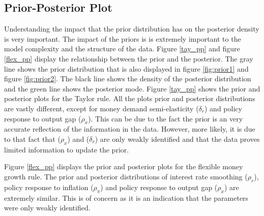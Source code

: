 \documentclass[11pt,preprint, authoryear]{elsarticle}
\numberwithin{equation}{section}
\numberwithin{figure}{section}
\numberwithin{table}{section}
\begin{document}
\hypertarget{prior-posterior-plot}{%
\subsection{Prior-Posterior Plot}\label{prior-posterior-plot}}

Understanding the impact that the prior distribution has on the
posterior density is very important. The impact of the priors is is
extremely important to the model complexity and the structure of the
data. Figure \ref{tay_pp} and figure \ref{flex_pp} display the
relationship between the prior and the posterior. The gray line shows
the prior distribution that is also displayed in figure \ref{fig:prior1}
and figure \ref{fig:prior2}. The black line shows the density of the
posterior distribution and the green line shows the posterior mode.
Figure \ref{tay_pp} shows the prior and posterior plots for the Taylor
rule. All the plots prior and posterior distributions are vastly
different, except for money demand semi-elasticity (\(\delta_r\)) and
policy response to output gap (\(\rho_x\)). This can be due to the fact
the prior is an very accurate reflection of the information in the data.
However, more likely, it is due to that fact that (\(\rho_x\)) and
(\(\delta_r\)) are only weakly identified and that the data proves
limited information to update the prior.

Figure \ref{flex_pp} displays the prior and posterior plots for the
flexible money growth rule. The prior and posterior distributions of
interest rate smoothing (\(\rho_r\)), policy response to inflation
(\(\rho_\pi\)) and policy response to output gap (\(\rho_x\)) are
extremely similar. This is of concern as it is an indication that the
parameters were only weakly identified.
\end{document}

